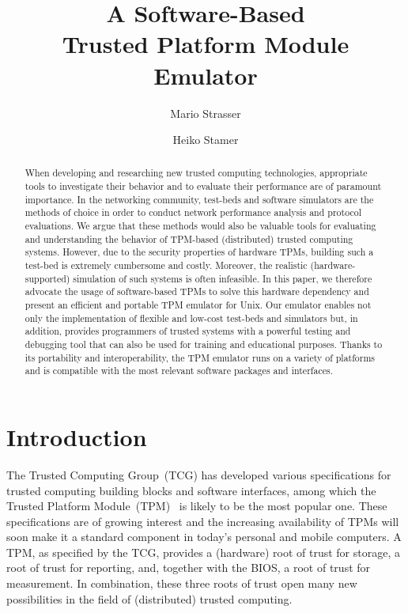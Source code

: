 \documentclass[runningheads]{llncs}
\title{A Software-Based\\ Trusted Platform Module Emulator}
\author{Mario Strasser\inst{1} \and Heiko Stamer\inst{2}}
\institute{
	ETH Zurich, Switzerland\\
	\email{strasser@tik.ee.ethz.ch}\\[3mm]
\and
	Fachbereich Elektrotechnik/Informatik, Universit\"at Kassel\\
	34109 Kassel, Germany\\
	\email{stamer@theory.informatik.uni-kassel.de}\\
}
\date{}
\begin{document}
\maketitle

\begin{abstract}
    When developing and researching new trusted computing technologies,
    appropriate tools to investigate their behavior and to evaluate their
    performance are of paramount importance. In the networking community,
    test-beds and software simulators are the methods of choice in order to
    conduct network performance analysis and protocol evaluations. We argue
    that these methods would also be valuable tools for evaluating and
    understanding the behavior of TPM-based (distributed) trusted computing
    systems. However, due to the security properties of hardware TPMs, building
    such a test-bed is extremely cumbersome and costly. Moreover, the realistic
    (hardware-supported) simulation of such systems is often infeasible. In this
    paper, we therefore advocate the usage of software-based TPMs to solve this
    hardware dependency and present an efficient and portable TPM emulator for
    Unix. Our emulator enables not only the implementation of flexible and
    low-cost test-beds and simulators but, in addition, provides programmers of
    trusted systems with a powerful testing and debugging tool that can also be
    used for training and educational purposes. Thanks to its portability and
    interoperability, the TPM emulator runs on a variety of platforms and is
    compatible with the most relevant software packages and interfaces.
\end{abstract}


\section{Introduction}
The Trusted Computing Group~(TCG) has developed various specifications for
trusted computing building blocks and software interfaces, among which the
Trusted Platform Module~(TPM)~\cite{TPM} is likely to be the most popular one.
These specifications are of growing interest and the increasing availability
of TPMs will soon make it a standard component in today's personal and mobile
computers. A TPM, as specified by the TCG, provides a (hardware) root of trust
for storage, a root of trust for reporting, and, together with the BIOS, a root
of trust for measurement. In combination, these three roots of trust open many
new possibilities in the field of (distributed) trusted computing.
\end{document}
